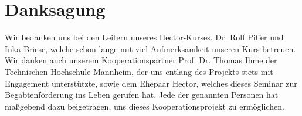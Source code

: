 \section*{Danksagung}
\label{sec:schlussteil}

Wir bedanken uns bei den Leitern unseres Hector-Kurses, Dr. Rolf Piffer und Inka Briese, welche schon lange mit viel Aufmerksamkeit unseren Kurs betreuen. Wir danken auch unserem Kooperationspartner Prof. Dr. Thomas Ihme der Technischen Hochschule Mannheim, der uns entlang des Projekts stets mit Engagement unterstützte, sowie dem Ehepaar Hector, welches dieses Seminar zur Begabtenförderung ins Leben gerufen hat. Jede der genannten Personen hat maßgebend dazu beigetragen, uns dieses Kooperationsprojekt zu ermöglichen.
